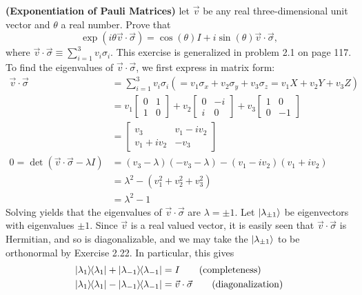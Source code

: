  \textbf{(Exponentiation of Pauli Matrices)} let $\vec{v}$ be any real three-dimensional unit vector and $\theta$ a real number.  Prove that $$\exp (i\theta\vec{v}\cdot\vec{\sigma}) = \cos(\theta)I+i\sin(\theta)\vec{v}\cdot\vec{\sigma},$$ where $\vec{v}\cdot\vec{\sigma} \equiv \sum_{i=1}^3 v_i\sigma_i$.  This exercise is generalized in problem 2.1 on page 117. 
\Soln To find the eigenvalues of $\vec{v}\cdot{\vec{\sigma}}$, we first express in matrix form:
\begin{align*}
	\vec{v} \cdot \vec{\sigma} &= \sum_{i=1}^3 v_i \sigma_i (= v_1\sigma_x + v_2\sigma_y + v_3\sigma_z = v_1X+v_2Y+v_3Z) \tag{definition}\\
		&= v_1 \begin{bmatrix}
		0 & 1 \\
		1 & 0
		\end{bmatrix}
		+ v_2 \begin{bmatrix}
		0 & -i \\
		i & 0
		\end{bmatrix}
		+ v_3 \begin{bmatrix}
		1 & 0 \\
		0 & -1
		\end{bmatrix} \tag{substitute}\\
		&= \begin{bmatrix}
		v_3 & v_1 - i v_2 \\
		v_1 + iv_2 & -v_3
		\end{bmatrix} \tag{collect terms} \\
	0=\det (\vec{v} \cdot \vec{\sigma}  - \lambda I) &= (v_3 - \lambda) (-v_3 - \lambda) - (v_1 - iv_2) (v_1 + iv_2) \tag{characteristic equation}\\
			&= \lambda^2 - (v_1^2 + v_2^2  + v_3^2) \tag{expand and collect $v$'s}\\
			&= \lambda^2 - 1 \tag{$v$ is a unit vector}
\end{align*}
Solving yields that the eigenvalues of $\vec{v}\cdot\vec{\sigma}$ are $\lambda = \pm 1$.
Let $\ket{\lambda_{ \pm 1 } }$ be eigenvectors with eigenvalues $\pm  1$.  Since $\vec{v}$ is a real valued vector, it is easily seen that $\vec{v} \cdot \vec{\sigma}$ is Hermitian, and so is diagonalizable, and we may take the $\ket{\lambda_{\pm 1}}$ to be orthonormal by Exercise 2.22.   In particular, this gives
\begin{align*}
	\ket{\lambda_1}\hspace{-1mm} \bra{\lambda_1} + \ket{\lambda_{-1}}\hspace{-1mm} \bra{\lambda_{-1}} &= I \tag{completeness} \\
	 \ket{\lambda_1}\hspace{-1mm} \bra{\lambda_1} - \ket{\lambda_{-1}}\hspace{-1mm} \bra{\lambda_{-1}} &= \vec{v} \cdot \vec{\sigma} \tag{diagonalization}
\end{align*}
